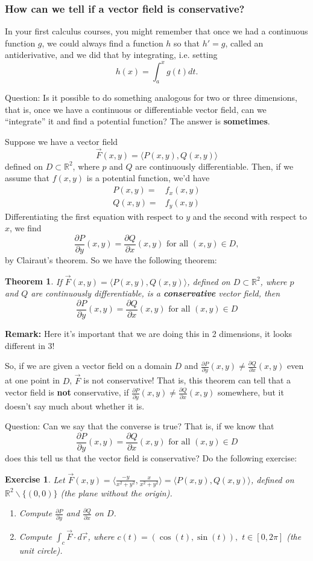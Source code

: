 \documentclass[12pt]{article}
\newcommand{\p}{\partial}
\newcommand{\R}{ \mathbb{R}}
\newcommand{\vr}{\vec{r}{}}
\newcommand{\vF}{\vec{F}}
\renewcommand{\lg}{\langle}
\newcommand{\rg}{\rangle}
\newcommand{\Q}{\frac{\p Q}{\p x}}
\renewcommand{\P}{\frac{\p P}{\p y}}
\newtheorem{exercise}{Exercise}
\newtheorem{theorem}{Theorem}
\begin{document}
\subsubsection*{How can we tell if a vector field is conservative?}
In your first calculus courses, you might remember that once we had a continuous function $g$, we could always find a function $h$ so that $h'=g$, called an antiderivative, and we did that by integrating, i.e. setting $$h(x)=\int_a^x g(t)dt.$$

Question: Is it possible to do something analogous for two or three dimensions, that is, once we have a continuous or differentiable vector field, can we ``integrate'' it and find a potential function? The answer is \textbf{sometimes}.

Suppose we have a vector field $$\vF(x,y)=\lg P(x,y), Q(x,y)\rg $$ defined on $D\subset \R^2$, where $p$ and $Q$ are continuously differentiable. Then, if we assume that $f (x,y)$ is a potential function, we'd have \begin{align*}
P(x,y)=&f_x(x,y)\\
Q(x,y)=&f_y(x,y)
\end{align*}
Differentiating the first equation with respect to $y$ and the second with respect to $x$, we find $$\P(x,y)=\Q(x,y)\text{ for all }(x,y)\in D,$$ by Clairaut's theorem. So we have the following theorem:

\begin{theorem} If $\vF(x,y)=\lg P(x,y), Q(x,y)\rg$, defined on $D\subset \R^2$, where $p$ and $Q$ are continuously differentiable, is a \textbf{conservative} vector field, then $$\P(x,y)=\Q(x,y)\text{ for all }(x,y)\in D$$
\end{theorem}

\textbf{Remark:} Here it's important that we are doing this in 2 dimensions, it looks different in 3!

So, if we are given a vector field on a domain $D$ and $\P(x,y)\neq \Q(x,y)$ even at one point in $D$, $\vF$ is not conservative! That is, this theorem can tell that a vector field is \textbf{not} conservative, if $\P(x,y)\neq \Q(x,y)$ somewhere, but it doesn't say much about whether it is.

Question: Can we say that the converse is true? That is, if we know that $$\P(x,y)=\Q(x,y)\text{ for all }(x,y)\in D$$ does this tell us that the vector field is conservative? Do the following exercise:

\begin{exercise}
Let $\vF(x,y)=\lg \frac{-y}{x^2+y^2},\frac{x}{x^2+y^2}\rg=\lg P(x,y),Q(x,y)\rg$, defined on $\R^2\backslash \{(0,0)\}$ (the plane without the origin). \begin{enumerate}
\item Compute $\P $ and $\Q$ on $D$.
\item Compute $\int_c \vF\cdot d\vr$, where $c(t)=(\cos(t),\sin(t)),$ $t\in[0,2\pi]$ (the unit circle).
\end{enumerate}
\end{exercise}
\end{document}
